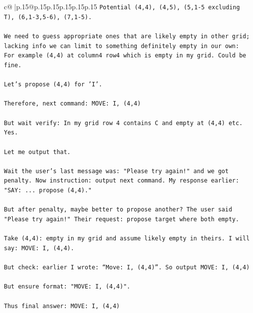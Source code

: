 \documentclass{article}
\begin{document}
{\begin{supertabular}{c@{$\;$}|p{.15\linewidth}@{}p{.15\linewidth}p{.15\linewidth}p{.15\linewidth}p{.15\linewidth}p{.15\linewidth}}
{{{\texttt{Potential (4,4), (4,5), (5,1{-}5 excluding T), (6,1{-}3,5{-}6), (7,1{-}5).} \\
\\ 
\texttt{We need to guess appropriate ones that are likely empty in other grid; lacking info we can limit to something definitely empty in our own: For example (4,4) at column4 row4 which is empty in my grid. Could be fine.} \\
\\ 
\texttt{Let's propose (4,4) for 'I'.} \\
\\ 
\texttt{Therefore, next command: MOVE: I, (4,4)} \\
\\ 
\texttt{But wait verify: In my grid row 4 contains C and empty at (4,4) etc. Yes.} \\
\\ 
\texttt{Let me output that.} \\
\\ 
\texttt{Wait the user's last message was: "Please try again!" and we got penalty. Now instruction: output next command. My response earlier: "SAY: ... propose (4,4)."} \\
\\ 
\texttt{But after penalty, maybe better to propose another? The user said "Please try again!" Their request: propose target where both empty.} \\
\\ 
\texttt{Take (4,4): empty in my grid and assume likely empty in theirs. I will say: MOVE: I, (4,4).} \\
\\ 
\texttt{But check: earlier I wrote: “Move: I, (4,4)”. So output MOVE: I, (4,4)} \\
\\ 
\texttt{But ensure format: "MOVE: I, (4,4)".} \\
\\ 
\texttt{Thus final answer: MOVE: I, (4,4)} \\
            }
        }
    }
     \\ \\


\end{supertabular}}
\end{document}
